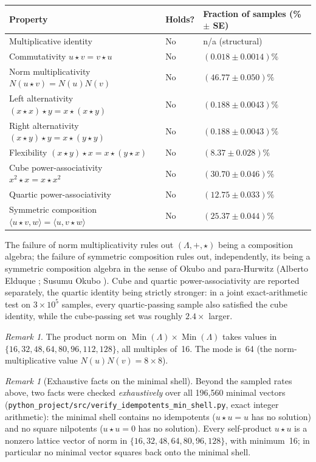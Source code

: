 \documentclass[twoside,english]{paper}
\numberwithin{equation}{section}
\numberwithin{figure}{section}
\theoremstyle{definition}
\theoremstyle{remark}
\newtheorem{remark}[theorem]{Remark}
\newcommand{\LL}{\Lambda}             %
\newcommand{\Nrm}{N}                  %
\begin{document}
\begin{center}
\begin{tabular}{@{}lll@{}}
\toprule
Property & Holds? & Fraction of samples (\% $\pm$ SE) \\
\midrule
Multiplicative identity & No & n/a (structural) \\
Commutativity $u\star v = v\star u$ & No &
  $(0.018 \pm 0.0014)\%$ \\
Norm multiplicativity $\Nrm(u\star v) = \Nrm(u)\Nrm(v)$ & No &
  $(46.77 \pm 0.050)\%$ \\
Left alternativity $(x\star x)\star y = x\star(x\star y)$ & No &
  $(0.188 \pm 0.0043)\%$ \\
Right alternativity $(x\star y)\star y = x\star(y\star y)$ & No &
  $(0.188 \pm 0.0043)\%$ \\
Flexibility $(x\star y)\star x = x\star(y\star x)$ & No &
  $(8.37 \pm 0.028)\%$ \\
Cube power-associativity $x^2\star x = x\star x^2$ & No &
  $(30.70 \pm 0.046)\%$ \\
Quartic power-associativity & No &
  $(12.75 \pm 0.033)\%$ \\
Symmetric composition $\langle u\star v, w\rangle =
  \langle u, v\star w\rangle$ & No &
  $(25.37 \pm 0.044)\%$ \\
\bottomrule
\end{tabular}
\end{center}

The failure of norm multiplicativity rules out $(\LL, +, \star)$
being a composition algebra; the failure of symmetric composition
rules out, independently, its being a symmetric composition algebra
in the sense of Okubo and para-Hurwitz
(Alberto Elduque \cite{Elduque1996, Elduque2023_IsotropicNorm};
Susumu Okubo \cite{Okubo1995_Book}).  Cube and quartic
power-associativity are reported separately, the quartic identity
being strictly stronger: in a joint exact-arithmetic test on
$3 \times 10^5$ samples, every quartic-passing sample also satisfied
the cube identity, while the cube-passing set was roughly
$2.4\times$ larger.

\begin{remark}
The product norm on $\operatorname{Min}(\LL) \times
\operatorname{Min}(\LL)$ takes values in
$\{16, 32, 48, 64, 80, 96, 112, 128\}$, all multiples of~16.
The mode is~64 (the norm-multiplicative value
$\Nrm(u)\Nrm(v) = 8 \times 8$).
\end{remark}

\begin{remark}[Exhaustive facts on the minimal shell]
Beyond the sampled rates above, two facts were checked
\emph{exhaustively} over all 196{,}560 minimal vectors
(\texttt{python\_project/src/verify\_idempotents\_min\_shell.py},
exact integer arithmetic): the minimal shell contains no
idempotents ($u \star u = u$ has no solution) and no square
nilpotents ($u \star u = 0$ has no solution).  Every self-product
$u \star u$ is a nonzero lattice vector of norm in
$\{16, 32, 48, 64, 80, 96, 128\}$, with minimum~16; in particular
no minimal vector squares back onto the minimal shell.
\end{remark}
\end{document}
